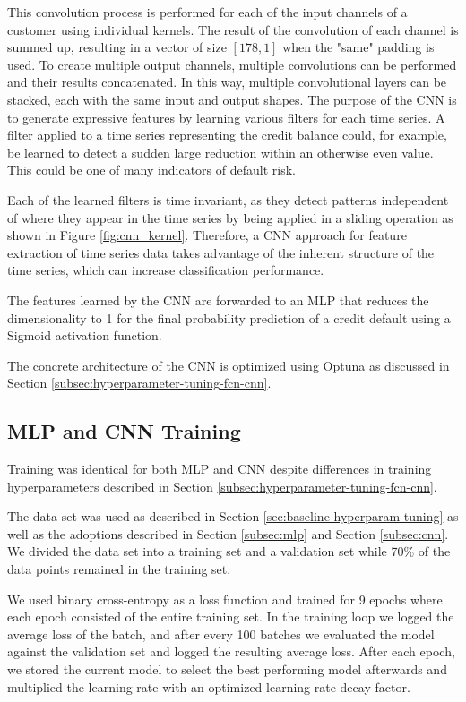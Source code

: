 \documentclass[runningheads]{llncs}
\begin{document}
This convolution process is performed for each of the input channels of a customer using individual kernels. The result of the convolution of each channel is summed up, resulting in a vector of size $[178, 1]$ when the "same" padding is used. To create multiple output channels, multiple convolutions can be performed and their results concatenated. In this way, multiple convolutional layers can be stacked, each with the same input and output shapes. 
The purpose of the CNN is to generate expressive features by learning various filters for each time series. A filter applied to a time series representing the credit balance could, for example, be learned to detect a sudden large reduction within an otherwise even value. This could be one of many indicators of default risk.

Each of the learned filters is time invariant, as they detect patterns independent of where they appear in the time series by being applied in a sliding operation as shown in Figure \ref{fig:cnn_kernel}. Therefore, a CNN approach for feature extraction of time series data takes advantage of the inherent structure of the time series, which can increase classification performance.


The features learned by the CNN are forwarded to an MLP that reduces the dimensionality to 1 for the final probability prediction of a credit default using a Sigmoid activation function.


The concrete architecture of the CNN is optimized using Optuna as discussed in Section \ref{subsec:hyperparameter-tuning-fcn-cnn}.





\subsection{MLP and CNN Training}
\label{subsec:train-fcn-cnn}
Training was identical for both MLP and CNN despite differences in training hyperparameters described in Section \ref{subsec:hyperparameter-tuning-fcn-cnn}.

The data set was used as described in Section \ref{sec:baseline-hyperparam-tuning} as well as the adoptions described in Section \ref{subsec:mlp} and Section \ref{subsec:cnn}. We divided the data set into a training set and a validation set while 70\% of the data points remained in the training set.

We used binary cross-entropy as a loss function and trained for 9 epochs where each epoch consisted of the entire training set. In the training loop we logged the average loss of the batch, and after every 100 batches we evaluated the model against the validation set and logged the resulting average loss. After each epoch, we stored the current model to select the best performing model afterwards and multiplied the learning rate with an optimized learning rate decay factor. 
\end{document}
